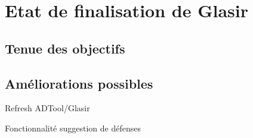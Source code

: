 \section{Etat de finalisation de Glasir}

\subsection{Tenue des objectifs}

\subsection{Améliorations possibles}
Refresh ADTool/Glasir

Fonctionnalité suggestion de défenses